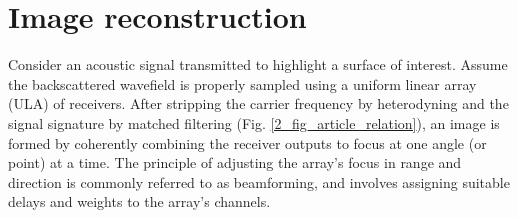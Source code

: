 {%
% 
% 
% 


%

%





\section{Image reconstruction}\label{methods}

Consider an acoustic signal transmitted to highlight a surface of interest. Assume the backscattered wavefield is properly sampled using a uniform linear array (ULA) of receivers. After stripping the carrier frequency by heterodyning and the signal signature by matched filtering (Fig. \ref{2_fig_article_relation}), an image is formed by coherently combining the receiver outputs to focus at one angle (or point) at a time. The principle of adjusting the array's focus in range and direction is commonly referred to as beamforming, and involves assigning suitable delays and weights to the array's channels.



}
